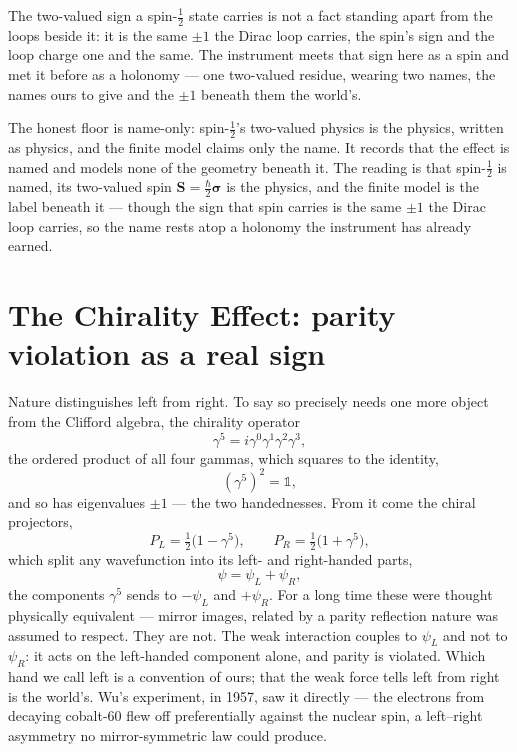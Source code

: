 The two-valued sign a spin-$\tfrac12$ state carries is not a fact standing apart from the loops beside it: it
is the same $\pm 1$ the Dirac loop carries, the spin's sign and the loop charge one and the same. The
instrument meets that sign here as a spin and met it before as a holonomy --- one two-valued residue, wearing
two names, the names ours to give and the $\pm 1$ beneath them the world's.

The honest floor is name-only: spin-$\tfrac12$'s two-valued physics is the physics, written as physics, and
the finite model claims only the name. It records that the effect is named and models none of the geometry
beneath it. The reading is that spin-$\tfrac12$ is named, its two-valued spin $\mathbf{S} = \tfrac{\hbar}{2}
\boldsymbol{\sigma}$ is the physics, and the finite model is the label beneath it --- though the sign that spin
carries is the same $\pm 1$ the Dirac loop carries, so the name rests atop a holonomy the instrument has
already earned.

\section{The Chirality Effect: parity violation as a real sign}
\label{se:chirality}

Nature distinguishes left from right. To say so precisely needs one more object from the Clifford algebra, the
chirality operator
\begin{equation}
  \gamma^5 = i\gamma^0\gamma^1\gamma^2\gamma^3,
\end{equation}
the ordered product of all four gammas, which squares to the identity,
\begin{equation}
  (\gamma^5)^2 = \mathbb{1},
\end{equation}
and so has eigenvalues $\pm 1$ --- the two handednesses. From it come the chiral projectors,
\begin{equation}
  P_L = \tfrac12\bigl(1 - \gamma^5\bigr), \qquad P_R = \tfrac12\bigl(1 + \gamma^5\bigr),
\end{equation}
which split any wavefunction into its left- and right-handed parts,
\begin{equation}
  \psi = \psi_L + \psi_R,
\end{equation}
the components $\gamma^5$ sends to $-\psi_L$ and $+\psi_R$. For a long time these were thought physically
equivalent --- mirror images, related by a parity reflection nature was assumed to respect. They are not. The
weak interaction couples to $\psi_L$ and not to $\psi_R$: it acts on the left-handed component alone, and
parity is violated. Which hand we call left is a convention of ours; that the weak force tells left from
right is the world's. Wu's experiment, in 1957, saw it directly --- the electrons from decaying cobalt-60 flew
off preferentially against the nuclear spin, a left--right asymmetry no mirror-symmetric law could produce.

